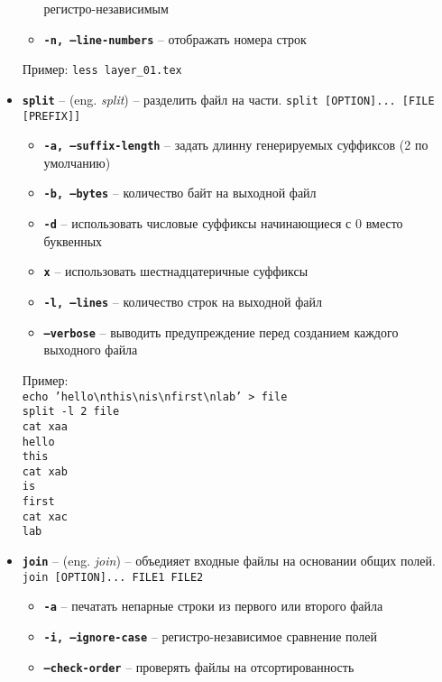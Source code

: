 \documentclass[12pt, a4paper]{article}
\begin{document}
\begin{itemize}
\begin{itemize}
      регистро-независимым
    \item \textbf{\texttt{-n, --line-numbers}} -- отображать номера строк
  \end{itemize}
  Пример: \texttt{less layer\_01.tex}
  \item \textbf{\texttt{split}} -- (eng. \textit{split}) -- разделить файл на
    части. \texttt{split [OPTION]... [FILE [PREFIX]]}
  \begin{itemize}
    \item \textbf{\texttt{-a, --suffix-length}} -- задать длинну генерируемых
      суффиксов (2 по умолчанию)
    \item \textbf{\texttt{-b, --bytes}} -- количество байт на выходной файл
    \item \textbf{\texttt{-d}} -- использовать числовые суффиксы начинающиеся
      с 0 вместо буквенных
    \item \textbf{\texttt{x}} -- использовать шестнадцатеричные суффиксы
    \item \textbf{\texttt{-l, --lines}} -- количество строк на выходной файл
    \item \textbf{\texttt{--verbose}} -- выводить предупреждение перед созданием
      каждого выходного файла
  \end{itemize}
  Пример:\\
  \texttt{echo 'hello\backslash nthis\backslash nis\backslash nfirst\backslash nlab' > file}\\
  \texttt{split -l 2 file}\\
  \texttt{cat xaa}\\
  \texttt{hello}\\
  \texttt{this}\\
  \texttt{cat xab}\\
  \texttt{is}\\
  \texttt{first}\\
  \texttt{cat xac}\\
  \texttt{lab}\\
  \item \textbf{\texttt{join}} -- (eng. \textit{join}) -- объедияет входные
    файлы на основании общих полей. \texttt{join [OPTION]... FILE1 FILE2}
  \begin{itemize}
    \item \textbf{\texttt{-a}} -- печатать непарные строки из первого или
      второго файла
    \item \textbf{\texttt{-i, --ignore-case}} -- регистро-независимое сравнение
      полей
    \item \textbf{\texttt{--check-order}} -- проверять файлы на отсортированность

\end{itemize}
\end{itemize}
\end{document}
